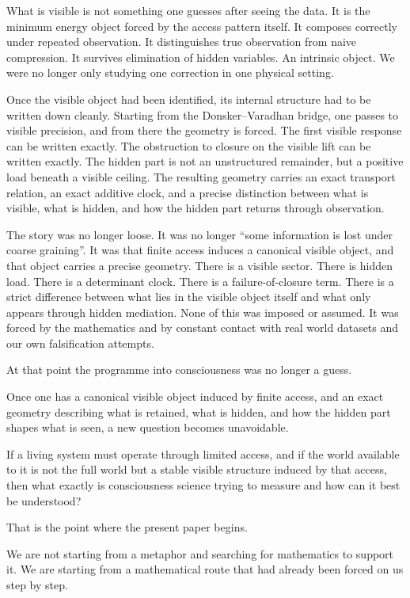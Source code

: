 \documentclass[11pt,a4paper]{article}
\numberwithin{equation}{section}
\theoremstyle{thmcompact}
\theoremstyle{remark}
\begin{document}
What is visible is not something one guesses after seeing the data. It is the minimum energy object forced by the access pattern itself. It composes correctly under repeated observation. It distinguishes true observation from naive compression. It survives elimination of hidden variables. An intrinsic object. We were no longer only studying one correction in one physical setting.

Once the visible object had been identified, its internal structure had to be written down cleanly. Starting from the Donsker--Varadhan bridge, one passes to visible precision, and from there the geometry is forced. The first visible response can be written exactly. The obstruction to closure on the visible lift can be written exactly. The hidden part is not an unstructured remainder, but a positive load beneath a visible ceiling. The resulting geometry carries an exact transport relation, an exact additive clock, and a precise distinction between what is visible, what is hidden, and how the hidden part returns through observation.

The story was no longer loose. It was no longer ``some information is lost under coarse graining''. It was that finite access induces a canonical visible object, and that object carries a precise geometry. There is a visible sector. There is hidden load. There is a determinant clock. There is a failure-of-closure term. There is a strict difference between what lies in the visible object itself and what only appears through hidden mediation. None of this was imposed or assumed. It was forced by the mathematics and by constant contact with real world datasets and our own falsification attempts.

At that point the programme into consciousness was no longer a guess.

Once one has a canonical visible object induced by finite access, and an exact geometry describing what is retained, what is hidden, and how the hidden part shapes what is seen, a new question becomes unavoidable.

If a living system must operate through limited access, and if the world available to it is not the full world but a stable visible structure induced by that access, then what exactly is consciousness science trying to measure and how can it best be understood?

That is the point where the present paper begins.

We are not starting from a metaphor and searching for mathematics to support it. We are starting from a mathematical route that had already been forced on us step by step.
\end{document}
